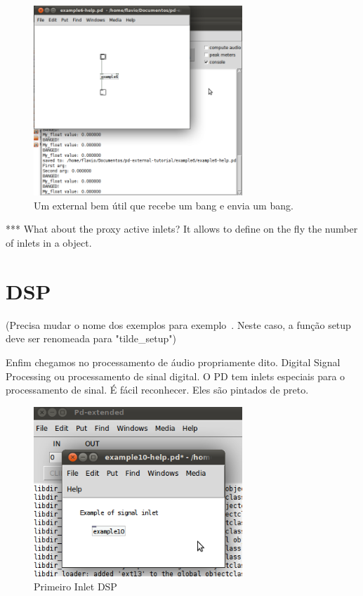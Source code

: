 \documentclass[10pt,a4paper]{report}
\begin{document}
\begin{figure}[h!]
	\centering
	\includegraphics[width=0.7\textwidth]{example6}
	\caption{Um external bem útil que recebe um bang e envia um bang.}
\end{figure}


*** What about the proxy active inlets? It allows to define on the fly the number of inlets in a object.


\chapter{DSP}
 (Precisa mudar o nome dos exemplos para exemplo~. Neste caso, a função setup deve ser renomeada para "tilde\_setup")

Enfim chegamos no processamento de áudio propriamente dito. Digital Signal Processing ou processamento de sinal digital. O PD tem inlets especiais para o processamento de sinal. É fácil reconhecer. Eles são pintados de preto.
\begin{figure}[h!]
	\centering
	\includegraphics[width=0.7\textwidth]{example10}
	\caption{Primeiro Inlet DSP}
\end{figure}
\end{document}
